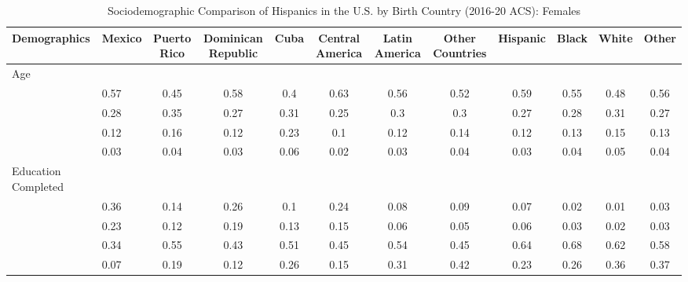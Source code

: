\documentclass[
]{article}
\begin{document}
\begin{landscape} 


\begin{table}[ht]
\centering
\caption{Sociodemographic Comparison of Hispanics in the U.S. by Birth Country (2016-20 ACS): Females} 
\begingroup\small
\begin{tabular}{>{\raggedright\arraybackslash}p{3.2cm}|lcccccc|cccc}
  \hline
Demographics & Mexico & Puerto Rico & Dominican Republic & Cuba & Central America & Latin America & Other Countries & Hispanic & Black & White & Other \\ 
  \hline
Age &  &  &  &  &  &  &  &  &  &  &  \\ 
  \multicolumn{1}{>{\raggedleft\arraybackslash}p{1.5cm}|}{\makebox[1.5cm][r]{60 - 69 }}& 0.57 & 0.45 & 0.58 & 0.4 & 0.63 & 0.56 & 0.52 & 0.59 & 0.55 & 0.48 & 0.56 \\ 
  \multicolumn{1}{>{\raggedleft\arraybackslash}p{1.5cm}|}{\makebox[1.5cm][r]{70 - 79 }}& 0.28 & 0.35 & 0.27 & 0.31 & 0.25 & 0.3 & 0.3 & 0.27 & 0.28 & 0.31 & 0.27 \\ 
  \multicolumn{1}{>{\raggedleft\arraybackslash}p{1.5cm}|}{\makebox[1.5cm][r]{80 - 89 }}& 0.12 & 0.16 & 0.12 & 0.23 & 0.1 & 0.12 & 0.14 & 0.12 & 0.13 & 0.15 & 0.13 \\ 
  \multicolumn{1}{>{\raggedleft\arraybackslash}p{1.5cm}|}{\makebox[1.5cm][r]{90 plus }}& 0.03 & 0.04 & 0.03 & 0.06 & 0.02 & 0.03 & 0.04 & 0.03 & 0.04 & 0.05 & 0.04 \\ 
  Education Completed &  &  &  &  &  &  &  &  &  &  &  \\ 
  \multicolumn{1}{>{\raggedleft\arraybackslash}p{3.2cm}|}{\makebox[3.2cm][r]{Less than Primary }}& 0.36 & 0.14 & 0.26 & 0.1 & 0.24 & 0.08 & 0.09 & 0.07 & 0.02 & 0.01 & 0.03 \\ 
  \multicolumn{1}{>{\raggedleft\arraybackslash}p{1.7cm}|}{\makebox[1.7cm][r]{Primary }}& 0.23 & 0.12 & 0.19 & 0.13 & 0.15 & 0.06 & 0.05 & 0.06 & 0.03 & 0.02 & 0.03 \\ 
  \multicolumn{1}{>{\raggedleft\arraybackslash}p{2cm}|}{\makebox[2cm][r]{Secondary }}& 0.34 & 0.55 & 0.43 & 0.51 & 0.45 & 0.54 & 0.45 & 0.64 & 0.68 & 0.62 & 0.58 \\ 
  \multicolumn{1}{>{\raggedleft\arraybackslash}p{2cm}|}{\makebox[2cm][r]{University }}& 0.07 & 0.19 & 0.12 & 0.26 & 0.15 & 0.31 & 0.42 & 0.23 & 0.26 & 0.36 & 0.37 \\ 

\end{tabular}
\end{table}
\end{landscape}
\end{document}
